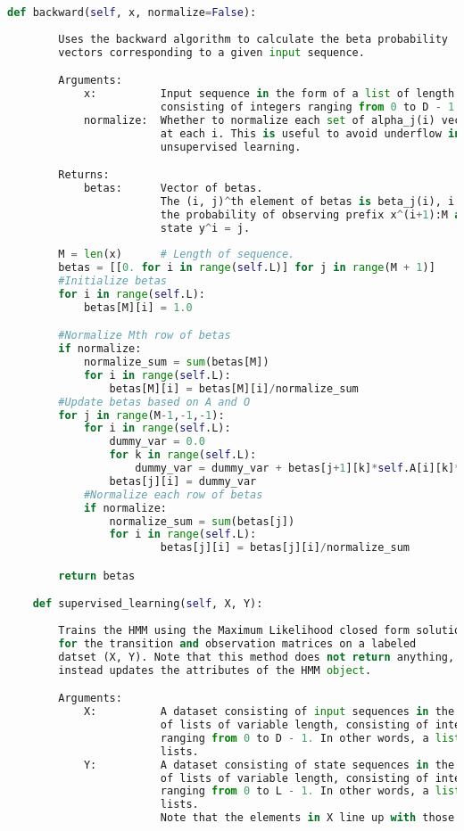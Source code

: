 \begin{lstlisting}[language=Python]
    def backward(self, x, normalize=False):
        
        Uses the backward algorithm to calculate the beta probability
        vectors corresponding to a given input sequence.

        Arguments:
            x:          Input sequence in the form of a list of length M,
                        consisting of integers ranging from 0 to D - 1.
            normalize:  Whether to normalize each set of alpha_j(i) vectors
                        at each i. This is useful to avoid underflow in
                        unsupervised learning.

        Returns:
            betas:      Vector of betas.
                        The (i, j)^th element of betas is beta_j(i), i.e.
                        the probability of observing prefix x^(i+1):M and
                        state y^i = j.
        
        M = len(x)      # Length of sequence.
        betas = [[0. for i in range(self.L)] for j in range(M + 1)]
        #Initialize betas
        for i in range(self.L):
            betas[M][i] = 1.0

        #Normalize Mth row of betas
        if normalize:
            normalize_sum = sum(betas[M])
            for i in range(self.L):
                betas[M][i] = betas[M][i]/normalize_sum
        #Update betas based on A and O
        for j in range(M-1,-1,-1):
            for i in range(self.L):
                dummy_var = 0.0
                for k in range(self.L):
                    dummy_var = dummy_var + betas[j+1][k]*self.A[i][k]*self.O[k][x[j]]
                betas[j][i] = dummy_var
            #Normalize each row of betas
            if normalize:
                normalize_sum = sum(betas[j])
                for i in range(self.L):
                        betas[j][i] = betas[j][i]/normalize_sum

        return betas

    def supervised_learning(self, X, Y):
        
        Trains the HMM using the Maximum Likelihood closed form solutions
        for the transition and observation matrices on a labeled
        datset (X, Y). Note that this method does not return anything, but
        instead updates the attributes of the HMM object.

        Arguments:
            X:          A dataset consisting of input sequences in the form
                        of lists of variable length, consisting of integers 
                        ranging from 0 to D - 1. In other words, a list of
                        lists.
            Y:          A dataset consisting of state sequences in the form
                        of lists of variable length, consisting of integers 
                        ranging from 0 to L - 1. In other words, a list of
                        lists.
                        Note that the elements in X line up with those in Y.
        

\end{lstlisting}
